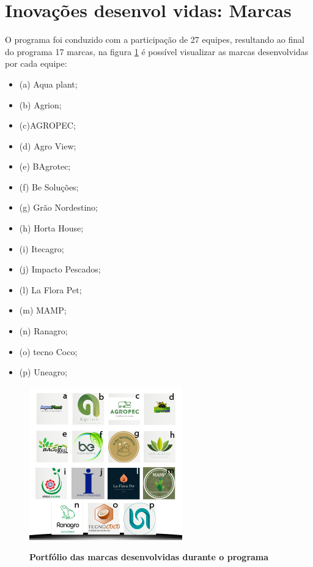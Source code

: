 




\section{Inovações desenvol vidas: Marcas}

O programa foi conduzido com a participação de 27 equipes, resultando ao final do programa  17 marcas, na figura \ref{figura_12} é possível visualizar as marcas desenvolvidas por cada equipe: 

\begin{multicols}{3}
\centering
    \begin{itemize}
\item {(a) Aqua plant;}
\item {(b) Agrion;}
\item {(c)AGROPEC;}
\item {(d) Agro View;}
\item {(e) BAgrotec;}
\item {(f) Be Soluções;}
\item {(g) Grão Nordestino;}
\item {(h) Horta House;}
\item {(i) Itecagro;}
\item {(j) Impacto Pescados;}
\item {(l) La Flora Pet;}
\item {(m) MAMP;}
\item {(n) Ranagro;}
\item {(o) tecno Coco;}
\item {(p) Uneagro;}
\end{itemize}
\end{multicols}

\begin{figure}[!htb]
\centering
\caption{\textbf{Portfólio das marcas desenvolvidas durante o programa}}
\includegraphics[scale=1.6]{Imagens/portfolio.png}
\label{figura_12}
\end{figure}

